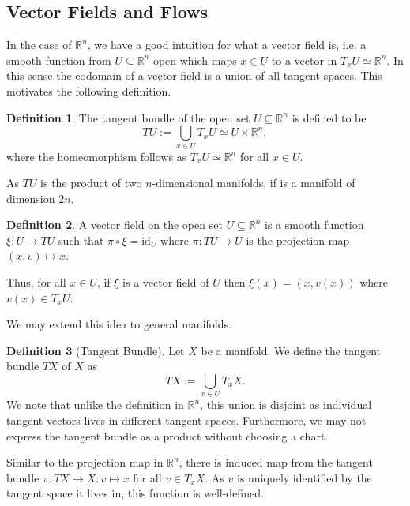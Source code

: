 \documentclass[]{article}
\theoremstyle{definition}
\theoremstyle{definition}
\newtheorem{definition}{Definition}[section]
\begin{document}
\subsection{Vector Fields and Flows}

In the case of \(\mathbb{R}^n\), we have a good intuition for what a vector field
is, i.e. a smooth function from \(U \subseteq \mathbb{R}^n\) open which maps 
\(x \in U\) to a vector in \(T_x U \simeq \mathbb{R}^n\). In this sense the 
codomain of a vector field is a union of all tangent spaces. This motivates the 
following definition.

\begin{definition}
  The tangent bundle of the open set \(U \subseteq \mathbb{R}^n\) is defined 
  to be 
  \[TU := \bigcup_{x \in U} T_x U \simeq U \times \mathbb{R}^n,\]
  where the homeomorphism follows as \(T_x U \simeq \mathbb{R}^n\) for all 
  \(x \in U\).
\end{definition}

As \(TU\) is the product of two \(n\)-dimensional manifolds, if is a manifold 
of dimension \(2n\).

\begin{definition}
  A vector field on the open set \(U \subseteq \mathbb{R}^n\) is a smooth 
  function \(\xi : U \to TU\) such that \(\pi \circ \xi = \text{id}_U\) where 
  \(\pi : TU \to U\) is the projection map \((x, v) \mapsto x\).
\end{definition}

Thus, for all \(x \in U\), if \(\xi\) is a vector field of \(U\) then 
\(\xi(x) = (x, v(x))\) where \(v(x) \in T_x U\).

We may extend this idea to general manifolds.

\begin{definition}[Tangent Bundle]
  Let \(X\) be a manifold. We define the tangent bundle \(TX\) of \(X\) as 
  \[TX := \bigcup_{x \in U} T_x X.\]
  We note that unlike the definition in \(\mathbb{R}^n\), this union is 
  disjoint as individual tangent vectors lives in different tangent spaces.
  Furthermore, we may not express the tangent bundle as a product without 
  choosing a chart. 
\end{definition}

Similar to the projection map in \(\mathbb{R}^n\), there is induced map 
from the tangent bundle \(\pi : TX \to X : v \mapsto x\) for all \(v \in T_x X\).
As \(v\) is uniquely identified by the tangent space it lives in, this function 
is well-defined.
\end{document}
